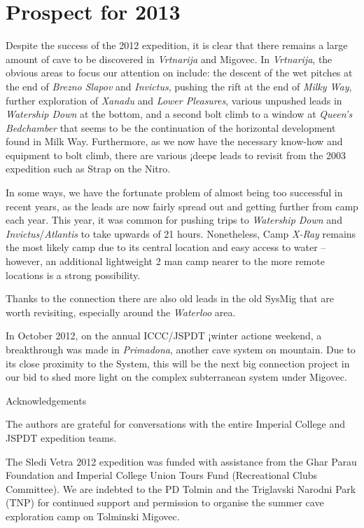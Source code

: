 
\section{Prospect for 2013}

Despite the success of the 2012 expedition, it is clear that there
remains a large amount of cave to be discovered in \emph{Vrtnarija} and
Migovec. In \emph{Vrtnarija}, the obvious areas to focus our attention
on include: the descent of the wet pitches at the end of \emph{Brezno
Slapov} and \emph{Invictus}, pushing the rift at the end of \emph{Milky
Way}, further exploration of \emph{Xanadu} and \emph{Lower Pleasures},
various unpushed leads in \emph{Watership Down} at the bottom, and a
second bolt climb to a window at \emph{Queen's Bedchamber} that seems to
be the continuation of the horizontal development found in Milk Way.
Furthermore, as we now have the necessary know-how and equipment to bolt
climb, there are various ¡deep¢ leads to revisit from the 2003
expedition such as Strap on the Nitro.

In some ways, we have the fortunate problem of almost being too
successful in recent years, as the leads are now fairly spread out and
getting further from camp each year. This year, it was common for
pushing trips to \emph{Watership Down} and
\emph{Invictus}/\emph{Atlantis} to take upwards of 21 hours.
Nonetheless, Camp \emph{X-Ray} remains the most likely camp due to its
central location and easy access to water -- however, an additional
lightweight 2 man camp nearer to the more remote locations is a strong
possibility.

Thanks to the connection there are also old leads in the old SysMig that
are worth revisiting, especially around the \emph{Waterloo} area.

In October 2012, on the annual ICCC/JSPDT ¡winter action¢ weekend, a
breakthrough was made in \emph{Primadona}, another cave system on
mountain. Due to its close proximity to the System, this will be the
next big connection project in our bid to shed more light on the complex
subterranean system under Migovec.

Acknowledgements

The authors are grateful for conversations with the entire Imperial
College and JSPDT expedition teams.

The Sledi Vetra 2012 expedition was funded with assistance from the Ghar
Parau Foundation and Imperial College Union Tours Fund (Recreational
Clubs Committee). We are indebted to the PD Tolmin and the Triglavski
Narodni Park (TNP) for continued support and permission to organise the
summer cave exploration camp on Tolminski Migovec.
